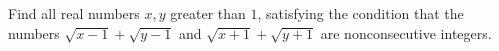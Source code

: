 Find all real numbers $x,y$ greater than $1$,  satisfying the condition that the numbers $\sqrt{x-1}+\sqrt{y-1}$ and $\sqrt{x+1}+\sqrt{y+1}$ are nonconsecutive integers.